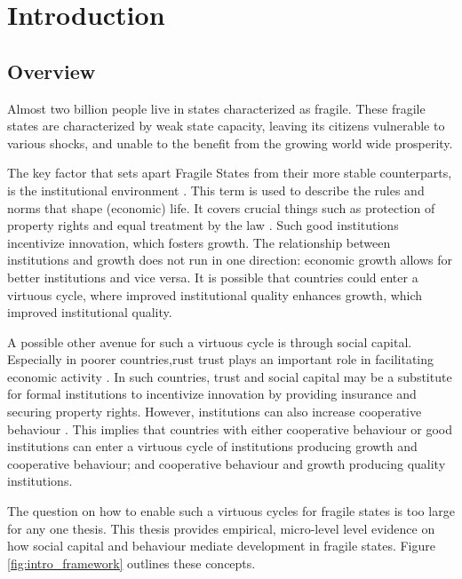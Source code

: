 \chapter{Introduction}
\section{Overview}



Almost two billion people live in states characterized  as fragile. These fragile states are characterized by weak state capacity, leaving its citizens vulnerable to various shocks, and unable to the benefit from the growing world wide prosperity. 

The key factor that sets apart Fragile States from their more stable counterparts, is the institutional environment \cite{Rodrik2004,Acemoglu2000}. This term is used to describe the rules and norms that shape (economic) life. It covers crucial things such as protection of property rights and equal treatment by the law \citep{Acemoglu2005}. Such good institutions incentivize innovation, which fosters growth. The relationship between institutions and growth does not run in one direction: economic growth allows for better institutions and vice versa. It is possible that countries could enter a virtuous cycle, where improved institutional quality enhances growth, which improved institutional quality.

A possible other avenue for such a virtuous cycle is through social capital.  Especially in poorer countries,rust  trust plays an important role in facilitating economic activity \citep{Knack1997}. In such countries, trust and social capital may be a substitute for formal institutions to incentivize innovation by providing insurance and securing property rights. However, institutions can also increase cooperative behaviour \cite{Bo2008,Henrich2010}. This implies that countries with either cooperative behaviour or good institutions can enter a virtuous cycle of institutions producing growth and cooperative behaviour; and cooperative behaviour and growth producing quality institutions.

The question on how to enable such a virtuous cycles for fragile states is too large for any one thesis. This thesis provides empirical, micro-level level evidence on how social capital and behaviour mediate development in fragile states. Figure \ref{fig:intro_framework} outlines these concepts. 

